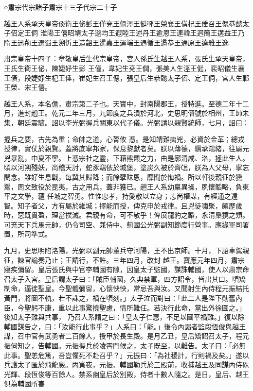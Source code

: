 
\begin{pinyinscope}

 ○肅宗代宗諸子肅宗十三子代宗二十子



 越王人系承天皇帝倓衛王佖彭王僅兗王僴涇王侹鄆王榮襄王僙杞王倕召王偲恭懿太子佋定王侗
 淮陽王僖昭靖太子邈均王遐睦王述丹王逾恩王連韓王迥簡王遘益王乃隋王迅荊王選蜀王溯忻王造韶王暹嘉王運端王遇循王遹恭王通原王逵雅王逸



 肅宗皇帝十四子：章敬皇后生代宗皇帝，宮人孫氏生越王人系，張氏生承天皇帝，王氏生衛王佖，陳婕妤生彭
 王僅，韋妃生兗王僴，張美人生涇王侹，裴昭儀生襄王僙，段婕妤生杞王倕，崔妃生召王偲，張皇后生恭懿太子佋、定王侗，宮人生鄆王榮、宋王僖。



 越王人系，本名儋，肅宗第二子也。天寶中，封南陽郡王，授特進。至德二年十二月，進封趙王。乾元二年三月，九節度之兵潰於河北，史思明僭號於相州，王師未集，朝廷震駭。詔以李光弼握兵關東以代子儀。光弼請以親賢統師，七月，詔曰：



 握兵之要，古先為重；命帥之道，心膂攸
 憑。是知靖難夷兇，必資於金革；總戎授律，實仗於親賢。蓋將底寧邦家，保息黎獻者矣。朕以薄德，纘承鴻緒，往屬元兇暴亂，中夏不寧。上憑宗社之靈，下藉熊羆之力，由是廓清咸、洛，拯此生人。頃以河朔殘妖，尚稽天討，蛇豕竊依於城堡，塗炭久被於齊氓，朕為人父母，寧忘閔念。雖好生息戰，每冀其歸降；而餘孽昧恩，靡聞於悔禍。所以軒後親征於獯鬻，周文致役於昆夷，古之用兵，蓋非獲已。趙王人系幼稟異操，夙懷韜略，負東平之文學，蘊
 任城之智勇。性惟忠孝，持愛敬以立身；志尚權謀，有經通之遠智。知子者父，方有屬於維城；擇能而授，俾克申於戎律。且兇徒嘯聚，頗歷歲時，惡既貫盈，理當撲滅。君親有命，可不敬乎！俾展龍豹之韜，永清梟獍之類。可充天下兵馬元帥，仍令司空、兼侍中、薊國公光弼副知節度行營事。應緣軍司署置，所司準式。



 九月，史思明陷洛陽，光弼以副元帥董兵守河陽，王不出京師。十月，下詔車駕親征，諫官論奏乃止；王請行，不許。三年四月，改封
 越王。寶應元年四月，肅宗寢疾彌留。皇后張氏與中官李輔國有隙，因皇太子監國，謀誅輔國，使人以肅宗命召太子入宮。皇后謂太子曰：「賊臣輔國，久典禁軍，四方詔令，皆出其口。頃矯制命，逼徙聖皇。今聖體彌留，心懷怏怏，常忌吾與汝。又聞射生內侍程元振結托黃門，將圖不軌，若不誅之，禍在頃刻。」太子泣而對曰：「此二人是陛下勛舊內臣，今聖躬不康，重以此事驚撓聖慮，情所難任。若決行此命，當出外徐圖之。」後知太子難與共事，
 乃召人系謂之曰：「皇太子仁惠，不足以圖平禍難。」復以除輔國謀告之，曰：「汝能行此事乎？」人系曰：「能。」後令內謁者監段恆俊與越王謀，召中官有武勇者二百餘人，授甲於長生殿。是月乙丑，皇后矯詔召太子，程元振伺知之，告輔國。元振握兵於凌霄門候之，太子既至，以難告。太子曰：「必無此事。聖恙危篤，吾豈懼死不赴召乎？」元振曰：「為社稷計，行則禍及矣。」遂以兵護太子匿於飛龍廄。丙寅夜，元振、輔國勒兵於三殿前，收捕越王及同謀內侍硃
 光輝、段恆俊等百餘人。禁系幽皇后於別殿，侍者十數人隨之。是日，皇后、越王俱為輔國所害




\end{pinyinscope}
